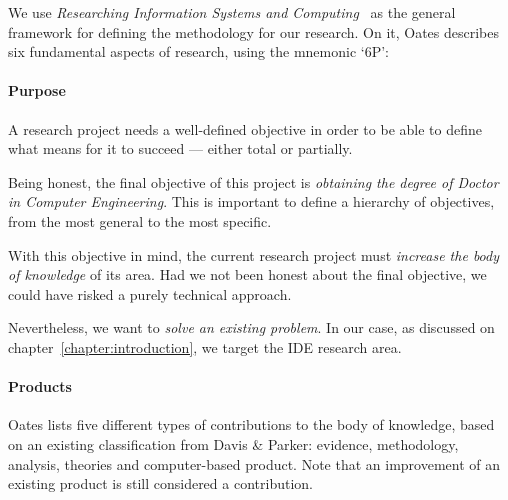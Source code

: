 We use \emph{Researching Information Systems and Computing}~\cite{Oates2006} as the
general framework for defining the methodology for our research. On it, Oates describes
six fundamental aspects of research, using the mnemonic `6P':


\paragraph{Purpose}
\label{method:purpose}
A research project needs a well-defined objective in order to be able
to define what means for it to succeed --- either total or partially.

Being honest, the final objective of this project is \emph{obtaining the
degree of Doctor in Computer Engineering}. This is important to define
a hierarchy of objectives, from the most general to the most specific. 

With this objective in mind, the current research project must
\emph{increase the body of knowledge} of its area. Had we not been honest
about the final objective, we could have risked a purely technical approach.

Nevertheless, we want to \emph{solve an existing problem}. In our case,
as discussed on chapter~\ref{chapter:introduction}, we target the
\gls{IDE} research area.

\paragraph{Products}
\label{method:products}
Oates lists five different types of contributions to the body of knowledge, based on
an existing classification from Davis \& Parker\cite{Oates2006,Davis1997}:
evidence, methodology, analysis, theories and computer-based product. Note
that an improvement of an existing product is still considered a contribution.

